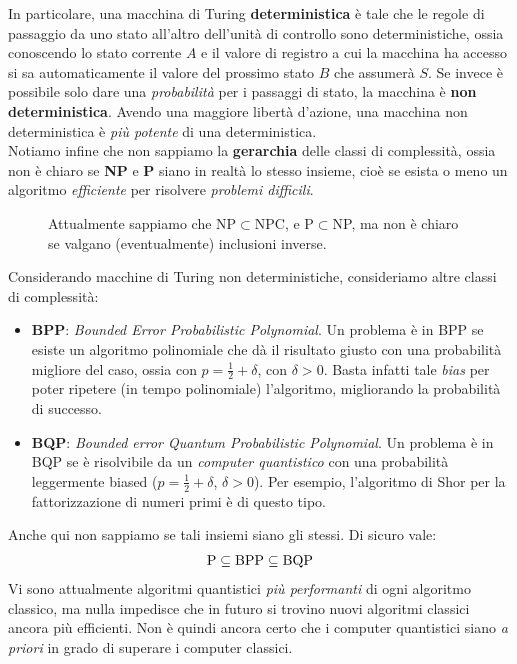 \documentclass[../../InformazioneQuantistica.tex]{subfiles}
\begin{document}
In particolare, una macchina di Turing \textbf{deterministica} è tale che le regole di passaggio da uno stato all'altro dell'unità di controllo sono deterministiche, ossia conoscendo lo stato corrente $A$ e il valore di registro a cui la macchina ha accesso si sa automaticamente il valore del prossimo stato $B$ che assumerà $S$. Se invece è possibile solo dare una \textit{probabilità} per i passaggi di stato, la macchina è \textbf{non deterministica}. Avendo una maggiore libertà d'azione, una macchina non deterministica è \textit{più potente} di una deterministica.\\

Notiamo infine che non sappiamo la \textbf{gerarchia} delle classi di complessità, ossia non è chiaro se \textbf{NP} e \textbf{P} siano in realtà lo stesso insieme, cioè se esista o meno un algoritmo \textit{efficiente} per risolvere \textit{problemi difficili}. 

\begin{figure}[H]
\centering

\caption{Attualmente sappiamo che NP$\subset$NPC, e P$\subset$NP, ma non è chiaro se valgano (eventualmente) inclusioni inverse.\label{fig:n-np-npc}}
\end{figure}

Considerando macchine di Turing non deterministiche, consideriamo altre classi di complessità:
\begin{itemize}
\item \textbf{BPP}: \textit{Bounded Error Probabilistic Polynomial}. Un problema è in BPP se esiste un algoritmo polinomiale che dà il risultato giusto con una probabilità migliore del caso, ossia con $p=\frac{1}{2}+\delta$, con $\delta >0$. Basta infatti tale \textit{bias} per poter ripetere (in tempo polinomiale) l'algoritmo, migliorando  la probabilità di successo.
\item \textbf{BQP}: \textit{Bounded error Quantum Probabilistic Polynomial}. Un problema è in BQP se è risolvibile da un \textit{computer quantistico} con una probabilità leggermente biased ($p=\frac{1}{2}+\delta$, $\delta >0$). Per esempio, l'algoritmo di Shor per la fattorizzazione di numeri primi è di questo tipo.
\end{itemize}

Anche qui non sappiamo se tali insiemi siano gli stessi. Di sicuro vale:
\begin{align*}
\operatorname{P} \subseteq \operatorname{BPP} \subseteq \operatorname{BQP}
\end{align*}
Vi sono attualmente algoritmi quantistici \textit{più performanti} di ogni algoritmo classico, ma nulla impedisce che in futuro si trovino nuovi algoritmi classici ancora più efficienti. Non è quindi ancora certo che i computer quantistici siano \textit{a priori} in grado di superare i computer classici.
\end{document}
